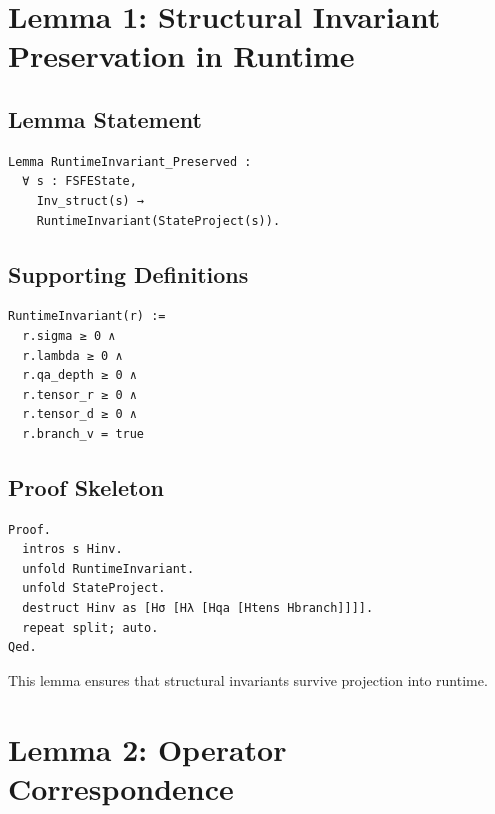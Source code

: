 \documentclass[11pt]{article}
\begin{document}
\newpage


\section{Lemma 1: Structural Invariant Preservation in Runtime}

\subsection{Lemma Statement}

\begin{verbatim}
Lemma RuntimeInvariant_Preserved :
  ∀ s : FSFEState,
    Inv_struct(s) →
    RuntimeInvariant(StateProject(s)).
\end{verbatim}

\subsection{Supporting Definitions}

\begin{verbatim}
RuntimeInvariant(r) :=
  r.sigma ≥ 0 ∧
  r.lambda ≥ 0 ∧
  r.qa_depth ≥ 0 ∧
  r.tensor_r ≥ 0 ∧
  r.tensor_d ≥ 0 ∧
  r.branch_v = true
\end{verbatim}

\subsection{Proof Skeleton}

\begin{verbatim}
Proof.
  intros s Hinv.
  unfold RuntimeInvariant.
  unfold StateProject.
  destruct Hinv as [Hσ [Hλ [Hqa [Htens Hbranch]]]].
  repeat split; auto.
Qed.
\end{verbatim}

This lemma ensures that structural invariants survive projection into runtime.

\newpage


\section{Lemma 2: Operator Correspondence}
\end{document}
